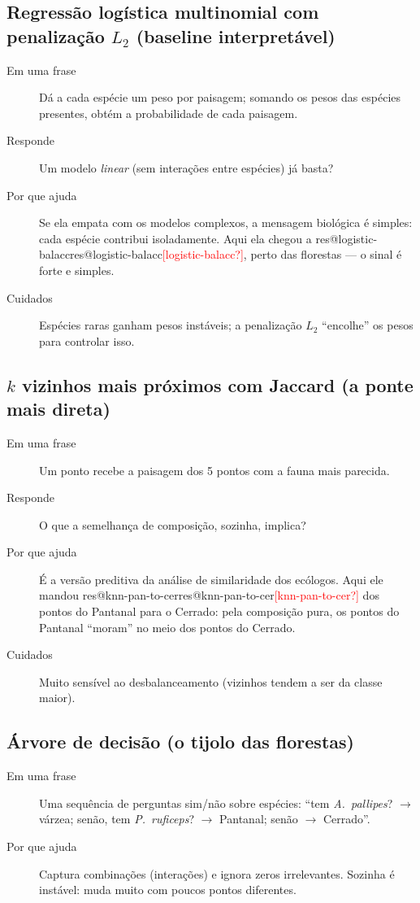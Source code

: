 \documentclass[11pt,a4paper]{article}
\makeatletter
\newcommand{\res}[1]{\ifcsname res@#1\endcsname\csname res@#1\endcsname\else\textcolor{red}{[#1?]}\fi}
\newcommand{\taxon}[1]{\textit{#1}}
\makeatother
\begin{document}
\subsection{Regressão logística multinomial com penalização \texorpdfstring{$L_2$}{L2} (baseline interpretável)}
\begin{description}
\item[Em uma frase] Dá a cada espécie um peso por paisagem; somando os pesos das espécies
presentes, obtém a probabilidade de cada paisagem.
\item[Responde] Um modelo \emph{linear} (sem interações entre espécies) já basta?
\item[Por que ajuda] Se ela empata com os modelos complexos, a mensagem biológica é simples:
cada espécie contribui isoladamente. Aqui ela chegou a \res{logistic-balacc}, perto das florestas
--- o sinal é forte e simples.
\item[Cuidados] Espécies raras ganham pesos instáveis; a penalização $L_2$ ``encolhe'' os pesos
para controlar isso.
\end{description}

\subsection{\texorpdfstring{$k$}{k} vizinhos mais próximos com Jaccard (a ponte mais direta)}
\begin{description}
\item[Em uma frase] Um ponto recebe a paisagem dos 5 pontos com a fauna mais parecida.
\item[Responde] O que a semelhança de composição, sozinha, implica?
\item[Por que ajuda] É a versão preditiva da análise de similaridade dos ecólogos. Aqui ele mandou
\res{knn-pan-to-cer} dos pontos do Pantanal para o Cerrado: pela composição pura, os pontos do
Pantanal ``moram'' no meio dos pontos do Cerrado.
\item[Cuidados] Muito sensível ao desbalanceamento (vizinhos tendem a ser da classe maior).
\end{description}

\subsection{Árvore de decisão (o tijolo das florestas)}
\begin{description}
\item[Em uma frase] Uma sequência de perguntas sim/não sobre espécies: ``tem \taxon{A.~pallipes}?
$\to$ várzea; senão, tem \taxon{P.~ruficeps}? $\to$ Pantanal; senão $\to$ Cerrado''.
\item[Por que ajuda] Captura combinações (interações) e ignora zeros irrelevantes. Sozinha é
instável: muda muito com poucos pontos diferentes.
\end{description}
\end{document}
